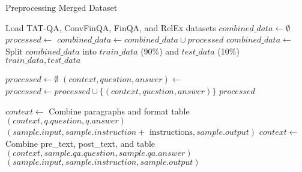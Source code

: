 \documentclass[logo,msc]{infthesis}           %
\begin{document}
\begin{algorithm}
\caption{Preprocessing Merged Dataset}
\label{alg:preprocess_financial}
\begin{algorithmic}[1]
    \State Load TAT-QA, ConvFinQA, FinQA, and RelEx datasets
    \State $combined\_data \gets \emptyset$
        \State $processed \gets $ 
        \State $combined\_data \gets combined\_data \cup processed$
    \EndFor
    \State $combined\_data \gets$ 
    \State Split $combined\_data$ into $train\_data$ (90\%) and $test\_data$ (10\%)
    \State \Return $train\_data, test\_data$
\EndProcedure

    \State $processed \gets \emptyset$
        \State $(context, question, answer) \gets$ 
        \State $processed \gets processed \cup \{(context, question, answer)\}$
    \EndFor
    \State \Return $processed$
\EndProcedure

        \State $context \gets$ Combine paragraphs and format table
            \State \Return $(context, q.question, q.answer)$
        \EndFor
        \State \Return $(sample.input, sample.instruction + \text{ instructions}, sample.output)$
        \State $context \gets$ Combine pre\_text, post\_text, and table
        \State \Return $(context, sample.qa.question, sample.qa.answer)$
        \State \Return $(sample.input, sample.instruction, sample.output)$
    \EndIf
\EndProcedure
\end{algorithmic}
\end{algorithm}
\end{document}
